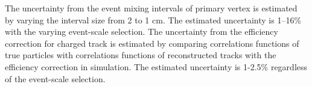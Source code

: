 The uncertainty from the event mixing intervals of primary vertex is estimated by varying the interval size from 2 to 1 cm. The estimated uncertainty is 1--16\% with the varying event-scale selection. The uncertainty from the efficiency correction for charged track is estimated by comparing correlations functions of true particles with correlations functions of reconstructed tracks with the efficiency correction in simulation. The estimated uncertainty is 1-2.5\% regardless of the event-scale selection.






\iffalse


